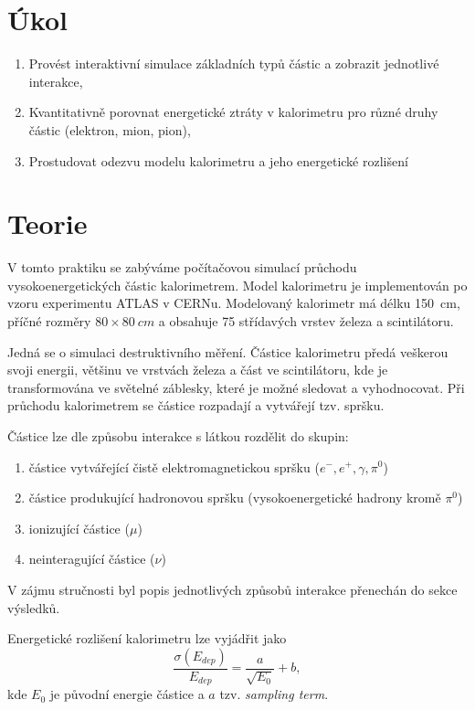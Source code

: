 \documentclass{protokol}
\begin{document}
  \section*{Úkol}

    \begin{enumerate}
      \item Provést interaktivní simulace základních typů částic a zobrazit jednotlivé interakce,
      \item Kvantitativně porovnat energetické ztráty v kalorimetru pro různé druhy částic (elektron, mion, pion), 
      \item Prostudovat odezvu modelu kalorimetru a jeho energetické rozlišení
    \end{enumerate}

  \section*{Teorie}

    V tomto praktiku se zabýváme počítačovou simulací průchodu vysokoenergetických částic kalorimetrem. Model kalorimetru je implementován po vzoru experimentu ATLAS v CERNu. Modelovaný kalorimetr má délku \SI{150}{cm}, příčné rozměry $80 \times \SI{80}{cm}$ a obsahuje 75 střídavých vrstev železa a scintilátoru.

    Jedná se o simulaci destruktivního měření. Částice kalorimetru předá veškerou svoji energii, většinu ve vrstvách železa a část ve scintilátoru, kde je transformována ve světelné záblesky, které je možné sledovat a vyhodnocovat. Při průchodu kalorimetrem se částice rozpadají a vytvářejí tzv. spršku.

    Částice lze dle způsobu interakce s látkou rozdělit do skupin:
    \begin{enumerate}
      \item částice vytvářející čistě elektromagnetickou spršku ($e^-, e^+, \gamma, \pi^0$)
      \item částice produkující hadronovou spršku (vysokoenergetické hadrony kromě $\pi^0$)
      \item ionizující částice ($\mu$)
      \item neinteragující částice ($\nu$)
    \end{enumerate}

    V zájmu stručnosti byl popis jednotlivých způsobů interakce přenechán do sekce výsledků.

    Energetické rozlišení kalorimetru lze vyjádřit jako 
    \begin{equation}
      \frac{\sigma(E_{dep})}{E_{dep}} = \frac{a}{\sqrt{E_0}} + b,
    \end{equation}
    kde $E_0$ je původní energie částice a $a$ tzv. \textit{sampling term}.
\end{document}
